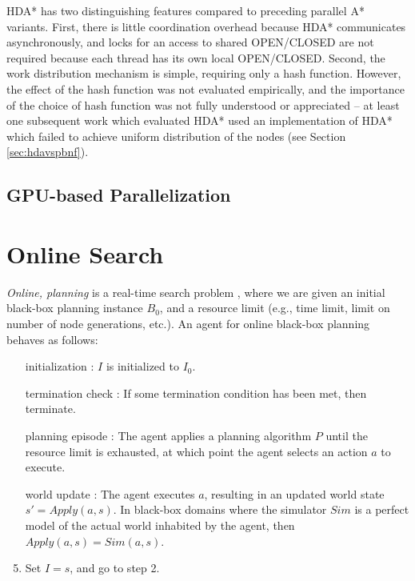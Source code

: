 \documentclass{book}
\begin{document}
HDA* has two distinguishing features compared to preceding parallel A* variants.
First, there is little coordination overhead because HDA* communicates asynchronously, and %
locks for an access to shared OPEN/CLOSED are not required because each thread has its own local OPEN/CLOSED.
Second, the work distribution mechanism is simple, requiring only a hash function.
However, the effect of the hash function was not evaluated empirically, and the importance of the choice of hash function was not fully understood or appreciated --
at least one subsequent work which evaluated HDA* used an implementation of HDA* which failed to achieve uniform distribution of the nodes (see Section \ref{sec:hdavspbnf}).%

\subsection{GPU-based Parallelization}


\section{Online Search}
\emph{Online, planning}  is a  real-time search  problem \cite{Korf90}, where we are given an initial black-box planning instance $B_0$, and a resource limit (e.g., time limit, limit on number of node generations, etc.).
An agent for online black-box planning behaves as follows:
\begin{enumerate}
\item [initialization]: $I$ is initialized to $I_0$.
\item [termination check]: If some termination condition has been met, then terminate.
\item [planning episode]: The agent applies a planning algorithm $P$ until the resource limit is exhausted, at which point the agent selects an action $a$ to execute.
\item [world update]: The agent executes $a$, resulting in an updated world state $s' = Apply(a,s)$. In black-box domains where the simulator $Sim$ is a perfect model of  the actual world inhabited by the agent, then $Apply(a,s) = Sim(a,s)$. 
\item Set $I= s$, and go to step 2.
\end{enumerate}
\end{document}
